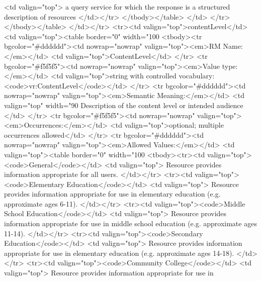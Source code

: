 \documentclass[11pt,a4paper]{ivoa}
\begin{document}
                     <td valign="top">
                       a query service for which the response is a structured
                       description of resources
                     </td></tr>
              </tbody></table>
              </td> 
          </tr></tbody></table>
      </td></tr>
  <tr><td valign="top">contentLevel</td>
      <td valign="top"><table border="0" width="100%
          <tbody><tr bgcolor="#dddddd"><td nowrap="nowrap" valign="top"><em>RM Name:</em></td>
              <td valign="top">ContentLevel</td>
          </tr>
          <tr bgcolor="#f5f5f5"><td nowrap="nowrap" valign="top"><em>Value type:</em></td>
              <td valign="top">string with controlled vocabulary: <code>vr:ContentLevel</code></td>
          </tr>
          <tr bgcolor="#dddddd"><td nowrap="nowrap" valign="top"><em>Semantic Meaning:</em></td>
              <td valign="top" width="90%
                Description of the content level or intended audience
              </td> 
          </tr>
          <tr bgcolor="#f5f5f5"><td nowrap="nowrap" valign="top"><em>Occurrences:</em></td>
              <td valign="top">optional; multiple occurrences allowed</td>
          </tr>
          <tr bgcolor="#dddddd"><td nowrap="nowrap" valign="top"><em>Allowed Values:</em></td>
              <td valign="top"><table border="0" width="100%
                 <tbody><tr><td valign="top"><code>General</code></td>
                     <td valign="top">
                       Resource provides information appropriate for all users.
                     </td></tr>
                 <tr><td valign="top"><code>Elementary Education</code></td>
                     <td valign="top">
                       Resource provides information appropriate for use in 
                       elementary education (e.g. approximate ages 6-11).
                     </td></tr>
                 <tr><td valign="top"><code>Middle School Education</code></td>
                     <td valign="top">
                       Resource provides information appropriate for use in 
                       middle school education (e.g. approximate ages 11-14).
                     </td></tr>
                 <tr><td valign="top"><code>Secondary Education</code></td>
                     <td valign="top">
                       Resource provides information appropriate for use in 
                       elementary education (e.g. approximate ages 14-18).
                     </td></tr>
                 <tr><td valign="top"><code>Community College</code></td>
                     <td valign="top">
                       Resource provides information appropriate for use in 
\end{document}
